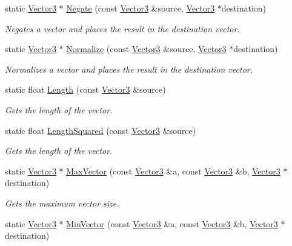 \begin{DoxyCompactItemize}
static \hyperlink{class_flounder_1_1_vector3}{Vector3} $\ast$ \hyperlink{class_flounder_1_1_vector3_a04cf52f53d1b530da027d7abb83da4da}{Negate} (const \hyperlink{class_flounder_1_1_vector3}{Vector3} \&source, \hyperlink{class_flounder_1_1_vector3}{Vector3} $\ast$destination)
\begin{DoxyCompactList}\small\item\em Negates a vector and places the result in the destination vector. \end{DoxyCompactList}\item 
static \hyperlink{class_flounder_1_1_vector3}{Vector3} $\ast$ \hyperlink{class_flounder_1_1_vector3_aef9af94dd8db49ceb2f24cbee6bb5f6f}{Normalize} (const \hyperlink{class_flounder_1_1_vector3}{Vector3} \&source, \hyperlink{class_flounder_1_1_vector3}{Vector3} $\ast$destination)
\begin{DoxyCompactList}\small\item\em Normalizes a vector and places the result in the destination vector. \end{DoxyCompactList}\item 
static float \hyperlink{class_flounder_1_1_vector3_a22ede14d4ba956bf16dee2b32284d083}{Length} (const \hyperlink{class_flounder_1_1_vector3}{Vector3} \&source)
\begin{DoxyCompactList}\small\item\em Gets the length of the vector. \end{DoxyCompactList}\item 
static float \hyperlink{class_flounder_1_1_vector3_aac2e9f56ad1eabd58beb24b3fbf3cff4}{Length\+Squared} (const \hyperlink{class_flounder_1_1_vector3}{Vector3} \&source)
\begin{DoxyCompactList}\small\item\em Gets the length of the vector. \end{DoxyCompactList}\item 
static \hyperlink{class_flounder_1_1_vector3}{Vector3} $\ast$ \hyperlink{class_flounder_1_1_vector3_a238085a03789f6d99c45340a82b72017}{Max\+Vector} (const \hyperlink{class_flounder_1_1_vector3}{Vector3} \&a, const \hyperlink{class_flounder_1_1_vector3}{Vector3} \&b, \hyperlink{class_flounder_1_1_vector3}{Vector3} $\ast$destination)
\begin{DoxyCompactList}\small\item\em Gets the maximum vector size. \end{DoxyCompactList}\item 
static \hyperlink{class_flounder_1_1_vector3}{Vector3} $\ast$ \hyperlink{class_flounder_1_1_vector3_ae40c52d1aa29f58494baba5a7b5e4a78}{Min\+Vector} (const \hyperlink{class_flounder_1_1_vector3}{Vector3} \&a, const \hyperlink{class_flounder_1_1_vector3}{Vector3} \&b, \hyperlink{class_flounder_1_1_vector3}{Vector3} $\ast$destination)

\end{DoxyCompactItemize}
